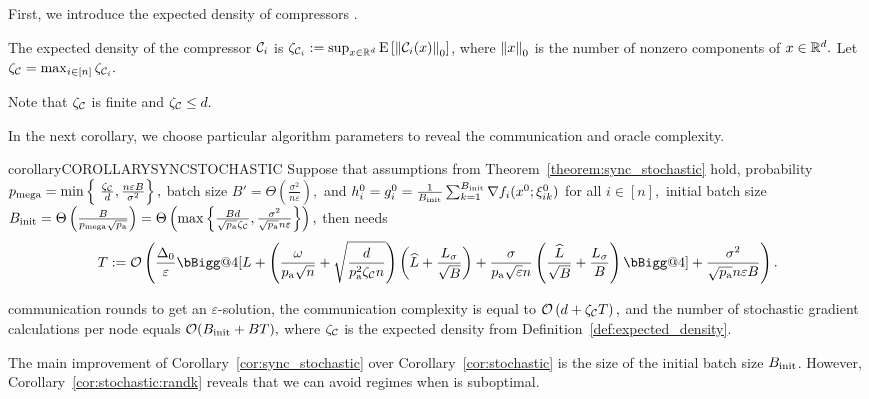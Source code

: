 \documentclass{article}
\makeatletter
\newcommand{\algorithmname}{DASHA-PP}
\newcommand*{\probavailable}{\ensuremath{p_{\textnormal{a}}}}
\newcommand*{\probmega}{\ensuremath{p_{\text{mega}}}}
\newcommand{\vast}{\bBigg@{4}}
\makeatother
\begin{document}
  First, we introduce the expected density of compressors \citep{MARINA,tyurin2022dasha}.

  \begin{definition}
    \label{def:expected_density}
    The expected density of the compressor $\mathcal{C}_i$ is $\zeta_{\mathcal{C}_i} := \sup_{x \in \mathbb{R}^d} {\rm E}\left[\left\| \mathcal{C}_i(x) \right\|_0\right]$, where $\left\| x \right\|_0$ is the number of nonzero components of $x \in \mathbb{R}^d.$ Let  $\zeta_{\mathcal{C}} = \max_{i \in [n]} \zeta_{\mathcal{C}_i}.$
  \end{definition}

  Note that $\zeta_{\mathcal{C}}$ is finite and $\zeta_{\mathcal{C}} \leq d.$

  In the next corollary, we choose particular algorithm parameters to reveal the communication and oracle complexity.

  \begin{restatable}{corollary}{COROLLARYSYNCSTOCHASTIC}
    \label{cor:sync_stochastic}
    Suppose that assumptions from Theorem~\ref{theorem:sync_stochastic} hold, probability $\probmega = \min \left\{\ \frac{\zeta_{\cC}}{d}, \frac{n \varepsilon B}{\sigma^2}\right\},$ batch size 
    $B' = \Theta\left(\frac{\sigma^2}{n \varepsilon}\right),$
    and $h^{0}_i = g^{0}_i = \frac{1}{B_{\textnormal{init}}} \sum_{k = 1}^{B_{\textnormal{init}}} \nabla f_i(x^0; \xi^0_{ik})$ for all $i \in [n],$ initial batch size 
    $B_{\textnormal{init}} = \Theta\left(\frac{B}{\probmega \sqrt{\probavailable}}\right) = \Theta\left(\max \left\{\frac{B d}{ \sqrt{\probavailable} \zeta_{\cC}},  \frac{\sigma^2}{\sqrt{\probavailable} n \varepsilon} \right\}\right),$ 
    then \algname{\algorithmname-SYNC-MVR}
    needs
    $$T \eqdef \cO\left(\frac{\Delta_0}{\varepsilon}\vast[L + \left(\frac{\omega}{\probavailable\sqrt{n}} + \sqrt{\frac{d}{\probavailable^2 \zeta_{\cC} n}}\right) \left(\widehat{L} + \frac{L_{\sigma}}{\sqrt{B}}\right)  + \frac{\sigma}{\probavailable \sqrt{\varepsilon} n} \left(\frac{\widehat{L}}{\sqrt{B}} + \frac{L_{\sigma}}{B}\right)\vast] + \frac{\sigma^2}{\sqrt{\probavailable} n \varepsilon B}\right).$$
  
    communication rounds to get an $\varepsilon$-solution, the communication complexity is equal to $\mathcal{O}\left(d + \zeta_{\mathcal{C}} T\right),$ and the number of stochastic gradient calculations per node equals $\mathcal{O}(B_{\textnormal{init}} + BT),$ where $\zeta_{\mathcal{C}}$ is the expected density from Definition~\ref{def:expected_density}.
  \end{restatable}

  The main improvement of Corollary~\ref{cor:sync_stochastic} over Corollary~\ref{cor:stochastic} is the size of the initial batch size $B_{\textnormal{init}}$. However, Corollary~\ref{cor:stochastic:randk} reveals that we can avoid regimes when \algname{\algorithmname-MVR} is suboptimal.
\end{document}
